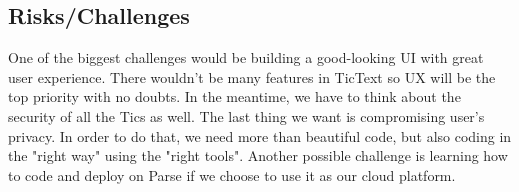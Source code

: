 \subsection{Risks/Challenges}
One of the biggest challenges would be building a good-looking UI with great user experience. There wouldn't be many features in TicText so UX will be the top priority with no doubts. In the meantime, we have to think about the security of all the Tics as well. The last thing we want is compromising user's privacy. In order to do that, we need more than beautiful code, but also coding in the "right way" using the "right tools". Another possible challenge is learning how to code and deploy on Parse if we choose to use it as our cloud platform. 

